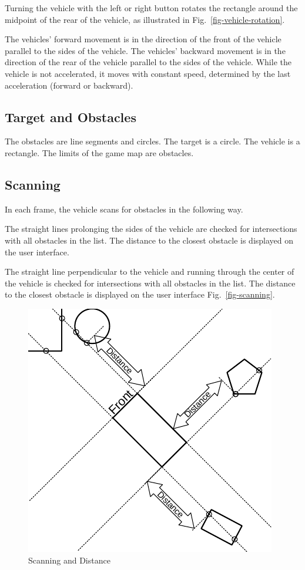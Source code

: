 \documentclass[11pt]{article}
\newcommand{\figref}[1]{Fig.~\eqref{#1}}
\begin{document}
Turning the vehicle with the left or right button rotates the rectangle
around the midpoint of the rear of the vehicle, as
illustrated in \figref{fig-vehicle-rotation}.

The vehicles' forward movement is in the direction of the front of the vehicle
parallel to the sides of the vehicle.
The vehicles' backward movement is in the direction of the rear of the vehicle
parallel to the sides of the vehicle.
While the vehicle is not accelerated, it moves with constant speed, determined
by the last acceleration (forward or backward).

\subsection{Target and Obstacles}
\label{sec-obstacles}

The obstacles are line segments and circles. The target is a circle. The
vehicle is a rectangle. The limits of the game map are obstacles.

\subsection{Scanning}
\label{sec-game-scanning}
In each frame, the vehicle scans for obstacles in the following way.

The straight lines prolonging the sides of the vehicle are checked for
intersections with all obstacles in the list. The distance to the closest
obstacle is displayed on the user interface.

The straight line perpendicular to the vehicle and running through the center
of the vehicle is checked for intersections with all obstacles in the list.
The distance to the closest obstacle is displayed on the user interface
\figref{fig-scanning}.

\begin{figure}
    \centering
    \includegraphics{odg/scanning.pdf}
    \caption{Scanning and Distance}\label{fig-scanning}
\end{figure}
\end{document}

